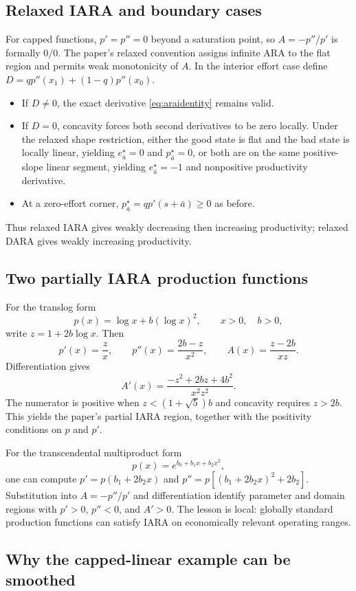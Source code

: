 \documentclass[11pt]{article}
\theoremstyle{tutorial}
\theoremstyle{remark}
\newcommand{\1}{\mathbb{I}}
\begin{document}
\subsection{Relaxed IARA and boundary cases}

For capped functions, $p'=p''=0$ beyond a saturation point, so $A=-p''/p'$ is formally $0/0$.  The paper's
relaxed convention assigns infinite ARA to the flat region and permits weak monotonicity of $A$.  In the
interior effort case define $D=q p''(x_1)+(1-q)p''(x_0)$.
\begin{itemize}
  \item If $D\ne0$, the exact derivative \eqref{eq:araidentity} remains valid.
  \item If $D=0$, concavity forces both second derivatives to be zero locally.  Under the relaxed shape
  restriction, either the good state is flat and the bad state is locally linear, yielding
  $e^\star_{\bar a}=0$ and $p^\star_{\bar a}=0$, or both are on the same positive-slope linear segment,
  yielding $e^\star_{\bar a}=-1$ and nonpositive productivity derivative.
  \item At a zero-effort corner, $p^\star_{\bar a}=q p'(s+\bar a)\ge0$ as before.
\end{itemize}
Thus relaxed IARA gives weakly decreasing then increasing productivity; relaxed DARA gives weakly
increasing productivity.

\subsection{Two partially IARA production functions}

For the translog form
\[
p(x)=\log x+b(\log x)^2,\qquad x>0,\quad b>0,
\]
write $z=1+2b\log x$.  Then
\[
p'(x)=\frac{z}{x},\qquad p''(x)=\frac{2b-z}{x^2},\qquad
A(x)=\frac{z-2b}{xz}.
\]
Differentiation gives
\[
A'(x)=\frac{-z^2+2bz+4b^2}{x^2z^2}.
\]
The numerator is positive when $z<(1+\sqrt5)b$ and concavity requires $z>2b$.  This yields the paper's
partial IARA region, together with the positivity conditions on $p$ and $p'$.

For the transcendental multiproduct form
\[
p(x)=e^{b_0+b_1x+b_2x^2},
\]
one can compute $p'=p(b_1+2b_2x)$ and
$p''=p[(b_1+2b_2x)^2+2b_2]$.  Substitution into $A=-p''/p'$ and differentiation identify parameter and
domain regions with $p'>0$, $p''<0$, and $A'>0$.  The lesson is local: globally standard production
functions can satisfy IARA on economically relevant operating ranges.

\subsection{Why the capped-linear example can be smoothed}
\end{document}
